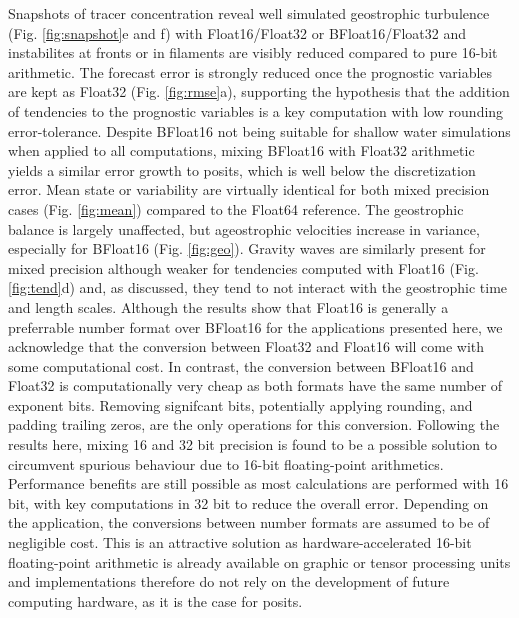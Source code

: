 \documentclass[draft]{agujournal2019}
\begin{document}
Snapshots of tracer concentration reveal well simulated geostrophic turbulence (Fig. \ref{fig:snapshot}e and f) with Float16/Float32 or BFloat16/Float32 and instabilites at fronts or in filaments are visibly reduced compared to pure 16-bit arithmetic. The forecast error is strongly reduced once the prognostic variables are kept as Float32 (Fig. \ref{fig:rmse}a), supporting the hypothesis that the addition of tendencies to the prognostic variables is a key computation with low rounding error-tolerance. Despite BFloat16 not being suitable for shallow water simulations when applied to all computations, mixing BFloat16 with Float32 arithmetic yields a similar error growth to posits, which is well below the discretization error. Mean state or variability are virtually identical for both mixed precision cases (Fig. \ref{fig:mean}) compared to the Float64 reference. The geostrophic balance is largely unaffected, but ageostrophic velocities increase in variance, especially for BFloat16 (Fig. \ref{fig:geo}). Gravity waves are similarly present for mixed precision although weaker for tendencies computed with Float16 (Fig. \ref{fig:tend}d) and, as discussed, they tend to not interact with the geostrophic time and length scales. Although the results show that Float16 is generally a preferrable number format over BFloat16 for the applications presented here, we acknowledge that the conversion between Float32 and Float16 will come with some computational cost. In contrast, the conversion between BFloat16 and Float32 is computationally very cheap as both formats have the same number of exponent bits. Removing signifcant bits, potentially applying rounding, and padding trailing zeros, are the only operations for this conversion. Following the results here, mixing 16 and 32 bit precision is found to be a possible solution to circumvent spurious behaviour due to 16-bit floating-point arithmetics. Performance benefits are still possible as most calculations are performed with 16 bit, with key computations in 32 bit to reduce the overall error. Depending on the application, the conversions between number formats are assumed to be of negligible cost. This is an attractive solution as hardware-accelerated 16-bit floating-point arithmetic is already available on graphic or tensor processing units and implementations therefore do not rely on the development of future computing hardware, as it is the case for posits.
\end{document}
